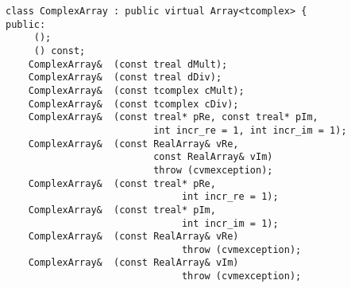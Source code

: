 \bigskip
\noindent
\verb"class ComplexArray : public virtual Array<tcomplex> {"\\
\verb"public:"\\
\verb"    "\verb" ();"\\
\verb"    "\verb" () const;"\\
\verb"    ComplexArray& "\verb" (const treal dMult);"\\
\verb"    ComplexArray& "\verb" (const treal dDiv);"\\
\verb"    ComplexArray& "\verb" (const tcomplex cMult);"\\
\verb"    ComplexArray& "\verb" (const tcomplex cDiv);"\\
\verb"    ComplexArray& "\verb" (const treal* pRe, const treal* pIm,"\\
\verb"                          int incr_re = 1, int incr_im = 1);"\\
\verb"    ComplexArray& "\verb" (const RealArray& vRe,"\\
\verb"                          const RealArray& vIm)"\\
\verb"                          throw (cvmexception);"\\
\verb"    ComplexArray& "\verb" (const treal* pRe,"\\
\verb"                               int incr_re = 1);"\\
\verb"    ComplexArray& "\verb" (const treal* pIm,"\\
\verb"                               int incr_im = 1);"\\
\verb"    ComplexArray& "\verb" (const RealArray& vRe)"\\
\verb"                               throw (cvmexception);"\\
\verb"    ComplexArray& "\verb" (const RealArray& vIm)"\\
\verb"                               throw (cvmexception);"\\
